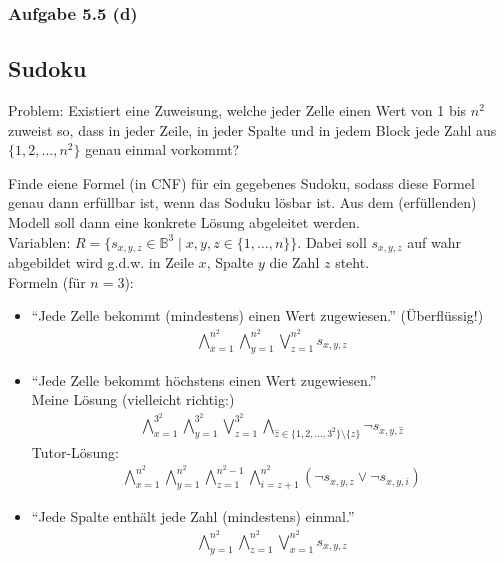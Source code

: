 \subsubsection{Aufgabe 5.5 (d)}

\subsection{Sudoku}
Problem: Existiert eine Zuweisung, welche jeder Zelle einen Wert von 1 bis $n^2$ zuweist so, dass in jeder Zeile, in jeder  Spalte und in jedem Block jede Zahl aus $\lbrace1,2,\ldots,n^2\rbrace$ genau einmal vorkommt?

\begin{aufgabe}
	Finde eiene Formel (in CNF) für ein gegebenes Sudoku, sodass diese Formel genau dann erfüllbar ist, wenn das Soduku lösbar ist. 
	Aus dem (erfüllenden) Modell soll dann eine konkrete Lösung abgeleitet werden.\\
	Variablen: $R=\big\lbrace s_{x,y,z}\in\mathbb{B}^3\mid x,y,z\in\lbrace 1,\ldots,n\rbrace\big\rbrace$.
	Dabei soll $s_{x,y,z}$ auf wahr abgebildet wird g.d.w. in Zeile $x$, Spalte $y$ die Zahl $z$ steht.\\
	Formeln (für $n=3$):
	\begin{itemize}
		\item ``Jede Zelle bekommt (mindestens) einen Wert zugewiesen.'' (Überflüssig!)
		\begin{align*}
			\bigwedge\limits_{x=1}^{n^2}\bigwedge\limits_{y=1}^{n^2}\bigvee\limits_{z=1}^{n^2} s_{x,y,z}
		\end{align*}
		\item ``Jede Zelle bekommt höchstens einen Wert zugewiesen.''\\
		Meine Lösung (vielleicht richtig:)
		\begin{align*}
			\bigwedge\limits_{x=1}^{3^2}\bigwedge\limits_{y=1}^{3^2}\bigvee\limits_{z=1}^{3^2}\bigwedge\limits_{\hat{z}\in\lbrace1,2,\ldots,3^2\rbrace\setminus\lbrace z\rbrace} \neg s_{x,y,\hat{z}}
		\end{align*}
		Tutor-Lösung:
		\begin{align*}
			\bigwedge\limits_{x=1}^{n^2}
			\bigwedge\limits_{y=1}^{n^2}
			\bigwedge\limits_{z=1}^{n^2-1}
			\bigwedge\limits_{i=z+1}^{n^2}
			(\neg s_{x,y,z}\vee\neg s_{x,y,i})
		\end{align*}
		\item ``Jede Spalte enthält jede Zahl (mindestens) einmal.''
		\begin{align*}
			\bigwedge\limits_{y=1}^{n^2}\bigwedge\limits_{z=1}^{n^2}\bigvee\limits_{x=1}^{n^2} s_{x,y,z}

\end{align*}
\end{itemize}
\end{aufgabe}
